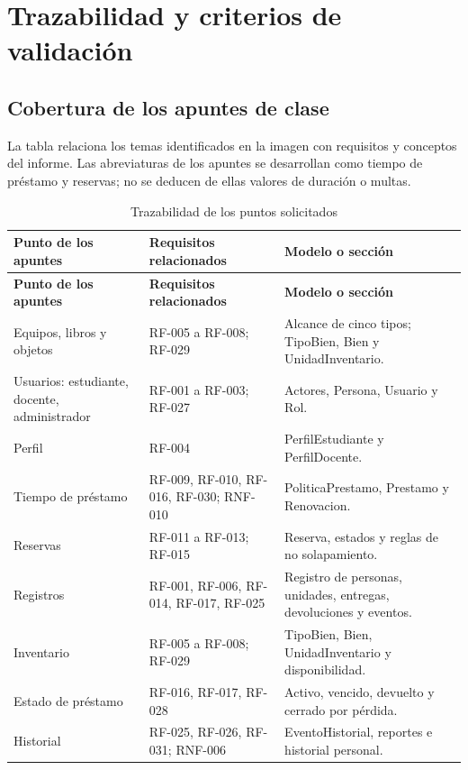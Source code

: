 \chapter{Trazabilidad y criterios de validaci\'on}
\label{ap:trazabilidad}

\section{Cobertura de los apuntes de clase}

La tabla relaciona los temas identificados en la imagen con requisitos y conceptos del informe. Las abreviaturas de los apuntes se desarrollan como tiempo de pr\'estamo y reservas; no se deducen de ellas valores de duraci\'on o multas.

\begingroup
\small
\begin{longtable}{@{}>{\raggedright\arraybackslash}p{3.3cm}>{\raggedright\arraybackslash}p{4.4cm}>{\raggedright\arraybackslash}p{6.6cm}@{}}
\caption{Trazabilidad de los puntos solicitados}\\
\toprule
\textbf{Punto de los apuntes} & \textbf{Requisitos relacionados} & \textbf{Modelo o secci\'on} \\
\midrule
\endfirsthead
\toprule
\textbf{Punto de los apuntes} & \textbf{Requisitos relacionados} & \textbf{Modelo o secci\'on} \\
\midrule
\endhead
\bottomrule
\endfoot
Equipos, libros y objetos & RF-005 a RF-008; RF-029 & Alcance de cinco tipos; TipoBien, Bien y UnidadInventario. \\
Usuarios: estudiante, docente, administrador & RF-001 a RF-003; RF-027 & Actores, Persona, Usuario y Rol. \\
Perfil & RF-004 & PerfilEstudiante y PerfilDocente. \\
Tiempo de pr\'estamo & RF-009, RF-010, RF-016, RF-030; RNF-010 & PoliticaPrestamo, Prestamo y Renovacion. \\
Reservas & RF-011 a RF-013; RF-015 & Reserva, estados y reglas de no solapamiento. \\
Registros & RF-001, RF-006, RF-014, RF-017, RF-025 & Registro de personas, unidades, entregas, devoluciones y eventos. \\
Inventario & RF-005 a RF-008; RF-029 & TipoBien, Bien, UnidadInventario y disponibilidad. \\
Estado de pr\'estamo & RF-016, RF-017, RF-028 & Activo, vencido, devuelto y cerrado por p\'erdida. \\
Historial & RF-025, RF-026, RF-031; RNF-006 & EventoHistorial, reportes e historial personal. \\

\end{longtable}
